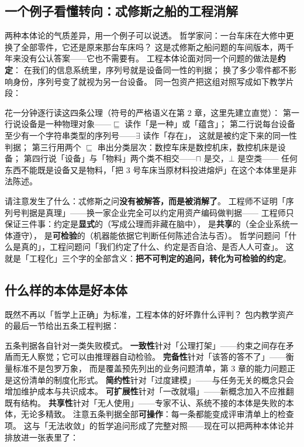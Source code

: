 \subsection{一个例子看懂转向：忒修斯之船的工程消解}

两种本体论的气质差异，用一个例子可以说透。
哲学家问：一台车床在大修中更换了全部零件，它还是原来那台车床吗？
这是忒修斯之船问题的车间版本，两千年来没有公认答案——它也不需要有。
工程本体论面对同一个问题的做法是\textbf{约定}：
在我们的信息系统里，序列号就是设备同一性的判据；
换了多少零件都不影响身份，序列号变了就视为另一台设备。
同一包资产把这组对照写成如下教学片段：



花一分钟逐行读这四条公理（符号的严格语义在第 2 章，这里先建立直觉）：
第一行说设备是一种物理对象——\(\sqsubseteq\) 读作「是一种」或「蕴含」；
第二行说每台设备至少有一个字符串类型的序列号——\(\exists\) 读作「存在」，
这就是被约定下来的同一性判据；
第三行用两个 \(\sqsubseteq\) 串出分类层次：数控车床是数控机床，数控机床是设备；
第四行说「设备」与「物料」两个类不相交——\(\sqcap\) 是交，\(\bot\) 是空类——
任何东西不能既是设备又是物料，「把 3 号车床当原材料投进熔炉」在这个本体里是非法陈述。

请注意发生了什么：忒修斯之问\textbf{没有被解答，而是被消解了}。
工程师不证明「序列号判据是真理」——换一家企业完全可以约定用资产编码做判据——
工程师只保证三件事：约定是\textbf{显式}的（写成公理而非藏在脑中），
是\textbf{共享}的（全企业系统一体遵守），
是\textbf{可检验}的（机器能依据它判断任何陈述合法与否）。
哲学问题问「什么是真的」，工程问题问「我们约定了什么、约定是否自洽、是否人人可查」。
这就是「工程化」三个字的全部含义：\textbf{把不可判定的追问，转化为可检验的约定}。

\subsection{什么样的本体是好本体}

既然不再以「哲学上正确」为标准，工程本体的好坏靠什么评判？
包内教学资产的最后一节给出五条工程判据：



五条判据各自针对一类失败模式。
\textbf{一致性}针对「公理打架」——约束之间存在矛盾而无人察觉；它可以由推理器自动检验。
\textbf{完备性}针对「该答的答不了」——衡量标准不是包罗万象，
而是覆盖预先列出的业务问题清单，第 3 章的能力问题正是这份清单的制度化形式。
\textbf{简约性}针对「过度建模」——与任务无关的概念只会增加维护成本与共识成本。
\textbf{可扩展性}针对「一改就塌」——新概念加入不应推翻既有结构。
\textbf{共享性}针对「无人使用」——专家不认、系统不接的本体是失败的本体，无论多精致。
注意五条判据全部\textbf{可操作}：每一条都能变成评审清单上的检查项。
这与「无法收敛」的哲学追问形成了完整对照——现在可以把两种本体论并排放进一张表里了：

